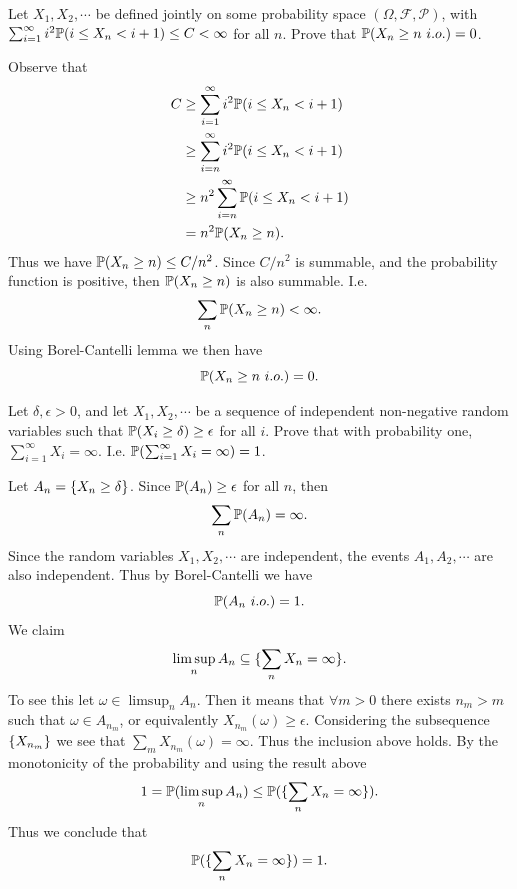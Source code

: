 \begin{problem}
	Let $ X_1,X_2,\cdots $ be defined jointly on some probability space $ (\Omega,\mathcal{F},\mathcal{P}) $, with $ \sum_{i=1}^{\infty}i^2\mathbb{P}(i \leq X_n < i+1) \leq C <\infty $ for all $ n $. Prove that $ \mathbb{P}(X_n \geq n\ i.o.) = 0 $.
\end{problem}
\begin{solution}
	Observe that
	\begin{align*}
		C &\geq \sum_{i=1}^{\infty}i^2\mathbb{P}(i\leq X_n < i+1) \\
		&\geq \sum_{i=n}^{\infty}i^2\mathbb{P}(i\leq X_n < i+1) \\
		&\geq n^2 \sum_{i=n}^{\infty}\mathbb{P}(i\leq X_n<i+1) \\
		&= n^2 \mathbb{P}(X_n \geq n).
	\end{align*}
	Thus we have $ \mathbb{P}(X_n\geq n) \leq C/n^2 $. Since $ C/n^2 $ is summable, and the probability function is positive, then $ \mathbb{P}(X_n \geq n) $ is also summable. I.e.
	\[ \sum_n \mathbb{P}(X_n \geq n) < \infty. \]
	Using Borel-Cantelli lemma we then have
	\[ \mathbb{P}(X_n \geq n\ i.o.) = 0. \]
\end{solution}


\begin{problem}
	Let $ \delta,\epsilon>0 $, and let $ X_1,X_2,\cdots $ be a sequence of independent non-negative random variables such that $ \mathbb{P}(X_i \geq \delta) \geq \epsilon $ for all $ i $. Prove that with probability one, $ \sum_{i=1}^{\infty}X_i = \infty $. I.e. $ \mathbb{P}(\sum_{i=1}^{\infty}X_i = \infty) = 1 $.
\end{problem}
\begin{solution}
	Let $ A_n = \{X_n \geq \delta\} $. Since $ \mathbb{P}(A_n)\geq\epsilon $ for all $ n $, then 
	\[ \sum_n \mathbb{P}(A_n) = \infty. \]
	Since the random variables $ X_1,X_2,\cdots $ are independent, the events $ A_1,A_2,\cdots $ are also independent. Thus by Borel-Cantelli we have
	\[ \mathbb{P}(A_n\ i.o.) = 1. \]
	We claim
	\[ \limsup_n A_n \subseteq \{\sum_n X_n = \infty\}. \]
	To see this let $ \omega\in \limsup_n A_n $. Then it means that $ \forall m > 0 $ there exists $ n_m > m $ such that $ \omega \in A_{n_m} $, or equivalently $ X_{n_m}(\omega) \geq \epsilon $. Considering the subsequence $ \{X_{n_m}\} $ we see that $ \sum_m X_{n_m}(\omega) = \infty $. Thus the inclusion above holds. By the monotonicity of the probability and using the result above 
	\[ 1 = \mathbb{P}(\limsup_n A_n) \leq \mathbb{P}(\{\sum_n X_n = \infty\}). \]
	Thus we conclude that 
	\[ \mathbb{P}(\{\sum_n X_n = \infty\}) = 1. \]
\end{solution}

